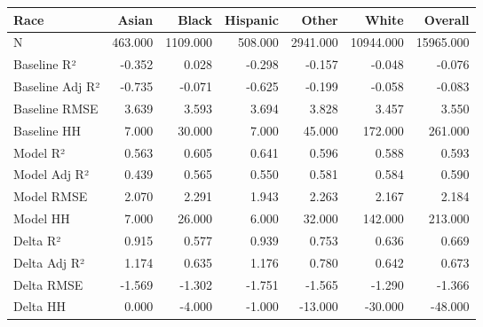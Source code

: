 \begin{tabular}{lrrrrrr}
\toprule
Race &   Asian &    Black &  Hispanic &    Other &     White &   Overall \\
\midrule
N               & 463.000 & 1109.000 &   508.000 & 2941.000 & 10944.000 & 15965.000 \\
Baseline R²     &  -0.352 &    0.028 &    -0.298 &   -0.157 &    -0.048 &    -0.076 \\
Baseline Adj R² &  -0.735 &   -0.071 &    -0.625 &   -0.199 &    -0.058 &    -0.083 \\
Baseline RMSE   &   3.639 &    3.593 &     3.694 &    3.828 &     3.457 &     3.550 \\
Baseline HH     &   7.000 &   30.000 &     7.000 &   45.000 &   172.000 &   261.000 \\
Model R²        &   0.563 &    0.605 &     0.641 &    0.596 &     0.588 &     0.593 \\
Model Adj R²    &   0.439 &    0.565 &     0.550 &    0.581 &     0.584 &     0.590 \\
Model RMSE      &   2.070 &    2.291 &     1.943 &    2.263 &     2.167 &     2.184 \\
Model HH        &   7.000 &   26.000 &     6.000 &   32.000 &   142.000 &   213.000 \\
Delta R²        &   0.915 &    0.577 &     0.939 &    0.753 &     0.636 &     0.669 \\
Delta Adj R²    &   1.174 &    0.635 &     1.176 &    0.780 &     0.642 &     0.673 \\
Delta RMSE      &  -1.569 &   -1.302 &    -1.751 &   -1.565 &    -1.290 &    -1.366 \\
Delta HH        &   0.000 &   -4.000 &    -1.000 &  -13.000 &   -30.000 &   -48.000 \\
\bottomrule
\end{tabular}
